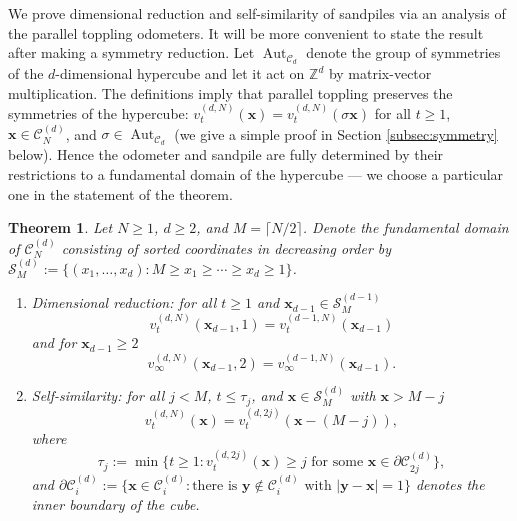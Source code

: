 \documentclass[12pt]{amsart}
\newtheorem{theorem}{Theorem}[section]
\newcommand{\Z}{\mathbb{Z}}
\begin{document}
	
	We prove dimensional reduction and self-similarity of sandpiles
	via an analysis of the parallel toppling odometers.  It will be more convenient to state the result after making a symmetry reduction. 
	 Let $\operatorname{Aut}_{\mathcal{C}_d}$ denote the group of symmetries of the $d$-dimensional hypercube and let it act on $\Z^d$ by matrix-vector multiplication.
	 The definitions imply that parallel toppling preserves the symmetries of the hypercube: 	$v_t^{(d,N)}(\mathbf{x}) = v_t^{(d,N)}( \sigma \mathbf{x})$ for all $t \geq 1$, $\mathbf{x} \in \mathcal{C}_N^{(d)}$, and $ \sigma \in \operatorname{Aut}_{\mathcal{C}_d}$ (we give a simple proof in Section \ref{subsec:symmetry} below).
	 Hence the odometer and sandpile are fully determined by their restrictions to
	a fundamental domain of the hypercube --- we choose a particular one in the statement of the theorem. 
	
	
	\begin{theorem}\label{the_theorem}
		Let $N \geq 1$, $d \geq 2$, and $M = \lceil N/2 \rceil$. Denote the fundamental domain of $\mathcal{C}_N^{(d)}$
		consisting of sorted coordinates in decreasing order by $\mathcal{S}^{(d)}_M := \{ (x_1, \ldots, x_d): M \geq x_1 \geq \cdots \geq x_d \geq 1 \}$.
		
		\begin{enumerate}
			\item{Dimensional reduction:} for all $t \geq 1$ and $\mathbf{x}_{d-1} \in \mathcal{S}_M^{(d-1)}$
			\begin{equation*}
			v_t^{(d, N)}(\mathbf{x}_{d-1}, 1) =  v_t^{(d-1, N)}(\mathbf{x}_{d-1})
			\end{equation*}
			and for $\mathbf{x}_{d-1} \geq 2$ 
			\begin{equation*}
			v_{\infty}^{(d,N)}(\mathbf{x}_{d-1}, 2) =  v_{\infty}^{(d-1,N)}(\mathbf{x}_{d-1}).
			\end{equation*}
			\item{Self-similarity:} for all $j < M$, $t \leq \tau_j$, and $\mathbf{x} \in \mathcal{S}_M^{(d)}$ with $\mathbf{x} > M-j$
			\begin{equation*}
			v_t^{(d, N)}(\mathbf{x}) = v_t^{(d, 2 j)}(\mathbf{x}-(M-j)),
			\end{equation*}
			where 
			\begin{equation*}
			\tau_{j} := \min\{ t \geq 1: v_t^{(d,2 j)}(\mathbf{x}) \geq  j  \mbox{ for some $\mathbf{x} \in \partial \mathcal{C}^{(d)}_{2 j}$} \},
			\end{equation*}
			and $\partial \mathcal{C}^{(d)}_i := \{ \mathbf{x} \in \mathcal{C}^{(d)}_i : \mbox{there is $\mathbf{y} \not \in \mathcal{C}^{(d)}_i$ with $|\mathbf{y}-\mathbf{x|} = 1$}\}$ denotes the inner boundary of the cube.
			
		\end{enumerate}
		
		
		
	\end{theorem} 
\end{document}
